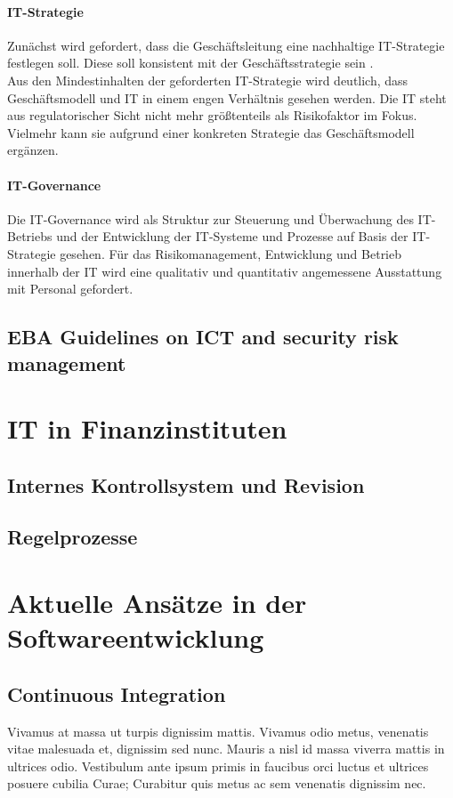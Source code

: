 \paragraph{IT-Strategie} Zunächst wird gefordert, dass die Geschäftsleitung eine nachhaltige IT-Strategie festlegen soll. Diese soll konsistent mit der Geschäftsstrategie sein \cite{BAIT:2018}. 
\\
Aus den Mindestinhalten der geforderten IT-Strategie wird deutlich, dass Geschäftsmodell und IT in einem engen Verhältnis gesehen werden. Die IT steht aus regulatorischer Sicht nicht mehr größtenteils als Risikofaktor im Fokus. Vielmehr kann sie aufgrund einer konkreten Strategie das Geschäftsmodell ergänzen.

\paragraph{IT-Governance} Die IT-Governance wird als Struktur zur Steuerung und Überwachung des IT-Betriebs und der Entwicklung der IT-Systeme und Prozesse auf Basis der IT-Strategie \cite{BAIT:2018} gesehen. Für das Risikomanagement, Entwicklung und Betrieb innerhalb der IT wird eine qualitativ und quantitativ angemessene Ausstattung mit Personal gefordert.

\subsection{EBA Guidelines on ICT and security risk management}

\section{IT in Finanzinstituten}

\subsection{Internes Kontrollsystem und Revision}

\subsection{Regelprozesse}

\section{Aktuelle Ansätze in der Softwareentwicklung}
\subsection{Continuous Integration}
\label{subsec:background:second_section:first_subsection}
Vivamus at massa ut turpis dignissim mattis. Vivamus odio metus, venenatis vitae malesuada et, dignissim sed nunc. Mauris a nisl id massa viverra mattis in ultrices odio. Vestibulum ante ipsum primis in faucibus orci luctus et ultrices posuere cubilia Curae; Curabitur quis metus ac sem venenatis dignissim nec.


